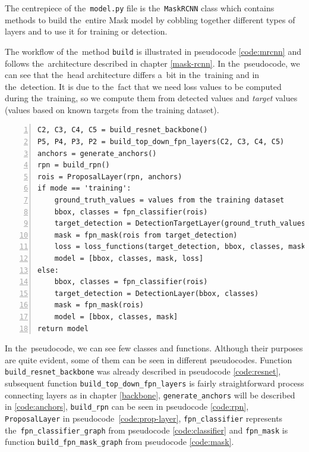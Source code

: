 The centrepiece of the~\verb|model.py| file is the~\verb|MaskRCNN| class which 
contains methods to build the~entire Mask  model by cobbling together 
different types of layers and to use it for training or detection.

The workflow of the~method \verb|build| is illustrated in pseudocode 
\ref{code:mrcnn} and follows the~architecture described in chapter 
\ref{mask-rcnn}. In the~pseudocode, we can see that the~head architecture 
differs a~bit in the~training and in the~detection. It is due to the~fact that 
we need loss values to be computed during the~training, so we compute them from 
detected values and \textit{target} values (values based on known targets from 
the training dataset).

{\scriptsize
\begin{lstlisting}[style=python, caption={Mask R-CNN.build}, captionpos=b, 
label=code:mrcnn, deletekeywords={from},
backgroundcolor = \color{light-gray}, numbers=left, breaklines=true]
C2, C3, C4, C5 = build_resnet_backbone()
P5, P4, P3, P2 = build_top_down_fpn_layers(C2, C3, C4, C5)
anchors = generate_anchors()
rpn = build_rpn()
rois = ProposalLayer(rpn, anchors)
if mode == 'training':
    ground_truth_values = values from the training dataset
    bbox, classes = fpn_classifier(rois)
    target_detection = DetectionTargetLayer(ground_truth_values)
    mask = fpn_mask(rois from target_detection)
    loss = loss_functions(target_detection, bbox, classes, mask)
    model = [bbox, classes, mask, loss]
else:
    bbox, classes = fpn_classifier(rois)
    target_detection = DetectionLayer(bbox, classes)
    mask = fpn_mask(rois)
    model = [bbox, classes, mask]
return model
\end{lstlisting}}

In the~pseudocode, we can see few classes and functions. Although their purposes are quite 
evident, some of them can be seen in different pseudocodes. Function
\verb|build_resnet_backbone| was already described in pseudocode \ref{code:resnet}, subsequent
func\-tion \verb|build_top_down_fpn_layers| is fairly straightforward process connecting 
layers as in chapter \ref{backbone}, \verb|generate_anchors| will be described 
in \ref{code:anchors}, \verb|build_rpn| can be seen in pseudocode 
\ref{code:rpn}, \verb|ProposalLayer| in pseudocode~\ref{code:prop-layer}, 
\verb|fpn_classifier| represents the~\verb|fpn_classifier_graph| from pseudocode 
\ref{code:classifier} and \verb|fpn_mask| is function \verb|build_fpn_mask_graph| from 
pseudocode \ref{code:mask}.


